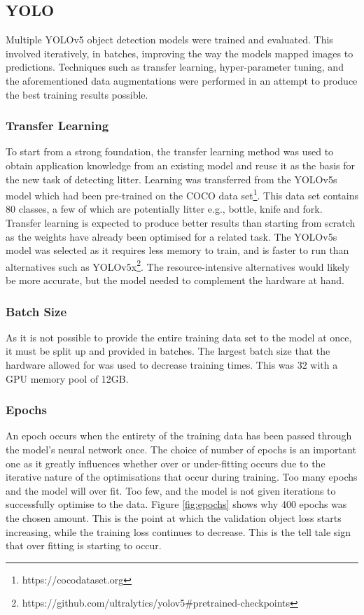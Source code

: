 \documentclass{thesis}
\begin{document}
\subsection{YOLO}

Multiple YOLOv5 object detection models were trained and evaluated. This involved iteratively, in batches, improving the way the models mapped images to predictions. Techniques such as transfer learning, hyper-parameter tuning, and the aforementioned data augmentations were performed in an attempt to produce the best training results possible.

\subsubsection{Transfer Learning}

To start from a strong foundation, the transfer learning method was used to obtain application knowledge from an existing model and reuse it as the basis for the new task of detecting litter. Learning was transferred from the YOLOv5s model which had been pre-trained on the COCO data set\footnote{https://cocodataset.org}. This data set contains 80 classes, a few of which are potentially litter e.g., bottle, knife and fork. Transfer learning is expected to produce better results than starting from scratch as the weights have already been optimised for a related task. The YOLOv5s model was selected as it requires less memory to train, and is faster to run than alternatives such as YOLOv5x\footnote{https://github.com/ultralytics/yolov5\#pretrained-checkpoints}. The resource-intensive alternatives would likely be more accurate, but the model needed to complement the hardware at hand.

\subsubsection{Batch Size} 

As it is not possible to provide the entire training data set to the model at once, it must be split up and provided in batches. The largest batch size that the hardware allowed for was used to decrease training times. This was 32 with a GPU memory pool of 12GB.

\subsubsection{Epochs} 

An epoch occurs when the entirety of the training data has been passed through the model's neural network once. The choice of number of epochs is an important one as it greatly influences whether over or under-fitting occurs due to the iterative nature of the optimisations that occur during training. Too many epochs and the model will over fit. Too few, and the model is not given iterations to successfully optimise to the data. Figure \ref{fig:epochs} shows why 400 epochs was the chosen amount. This is the point at which the validation object loss starts increasing, while the training loss continues to decrease. This is the tell tale sign that over fitting is starting to occur.
\end{document}
